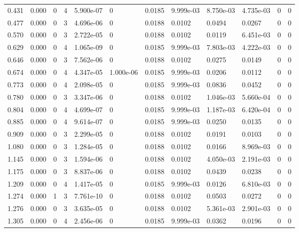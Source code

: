 \documentclass[preview]{standalone}
\begin{document}
{{\begin{tabular}{L{1.2cm}C{1.2cm} C{0.3cm}C{0.5cm} C{1.4cm}C{1.4cm} C{1.4cm}C{1.4cm} C{1.6cm}C{1.6cm} C{1.6cm}C{1.6cm}}
  0.431  &  0.000  & 0     &  4 &  5.900e-07  & 0  &  0.0185&   9.999e-03& 8.750e-03 & 4.735e-03   &  0 & 0  \\ 
  0.477  &  0.000  & 0     &  3 &  4.696e-06  & 0  &  0.0188&   0.0102& 0.0494 & 0.0267   &  0 & 0  \\ 
  0.570  &  0.000  & 0     &  3 &  2.722e-05  & 0  &  0.0188&   0.0102& 0.0119 & 6.451e-03   &  0 & 0  \\ 
  0.629  &  0.000  & 0     &  4 &  1.065e-09  & 0  &  0.0185&   9.999e-03& 7.803e-03 & 4.222e-03   &  0 & 0  \\ 
  0.646  &  0.000  & 0     &  3 &  7.562e-06  & 0  &  0.0188&   0.0102& 0.0275 & 0.0149   &  0 & 0  \\ 
  0.674  &  0.000  & 0     &  4 &  4.347e-05  & 1.000e-06  &  0.0185&   9.999e-03& 0.0206 & 0.0112   &  0 & 0  \\ 
  0.773  &  0.000  & 0     &  4 &  2.098e-05  & 0  &  0.0185&   9.999e-03& 0.0836 & 0.0452   &  0 & 0  \\ 
  0.780  &  0.000  & 0     &  3 &  3.347e-06  & 0  &  0.0188&   0.0102& 1.046e-03 & 5.660e-04   &  0 & 0  \\ 
  0.804  &  0.000  & 0     &  4 &  4.699e-07  & 0  &  0.0185&   9.999e-03& 1.187e-03 & 6.420e-04   &  0 & 0  \\ 
  0.885  &  0.000  & 0     &  4 &  9.614e-07  & 0  &  0.0185&   9.999e-03& 0.0250 & 0.0135   &  0 & 0  \\ 
  0.909  &  0.000  & 0     &  3 &  2.299e-05  & 0  &  0.0188&   0.0102& 0.0191 & 0.0103   &  0 & 0  \\ 
  1.080  &  0.000  & 0     &  3 &  1.284e-05  & 0  &  0.0188&   0.0102& 0.0166 & 8.969e-03   &  0 & 0  \\ 
  1.145  &  0.000  & 0     &  3 &  1.594e-06  & 0  &  0.0188&   0.0102& 4.050e-03 & 2.191e-03   &  0 & 0  \\ 
  1.175  &  0.000  & 0     &  3 &  8.837e-06  & 0  &  0.0188&   0.0102& 0.0439 & 0.0238   &  0 & 0  \\ 
  1.209  &  0.000  & 0     &  4 &  1.417e-05  & 0  &  0.0185&   9.999e-03& 0.0126 & 6.810e-03   &  0 & 0  \\ 
  1.274  &  0.000  & 1     &  3 &  7.761e-10  & 0  &  0.0188&   0.0102& 0.0503 & 0.0272   &  0 & 0  \\ 
  1.276  &  0.000  & 0     &  3 &  3.635e-05  & 0  &  0.0188&   0.0102& 5.361e-03 & 2.901e-03   &  0 & 0  \\ 
  1.305  &  0.000  & 0     &  4 &  2.456e-06  & 0  &  0.0185&   9.999e-03& 0.0362 & 0.0196   &  0 & 0  \\ 

\end{tabular}}}
\end{document}
